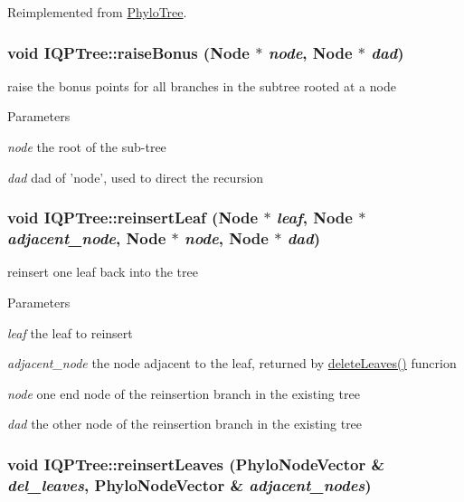 Reimplemented from \hyperlink{classPhyloTree_a8927dbf75a06ea797cc76b619759985d}{PhyloTree}.\hypertarget{classIQPTree_a72733c572a34fce5483d9c58fddc54d1}{
\subsubsection[{raiseBonus}]{\setlength{\rightskip}{0pt plus 5cm}void IQPTree::raiseBonus ({\bf Node} $\ast$ {\em node}, \/  {\bf Node} $\ast$ {\em dad})}}
\label{classIQPTree_a72733c572a34fce5483d9c58fddc54d1}
raise the bonus points for all branches in the subtree rooted at a node 
\begin{DoxyParams}{Parameters}
\item[{\em node}]the root of the sub-\/tree \item[{\em dad}]dad of 'node', used to direct the recursion \end{DoxyParams}
\hypertarget{classIQPTree_ad6adbd783583faa754deb9c6d15eb93f}{
\subsubsection[{reinsertLeaf}]{\setlength{\rightskip}{0pt plus 5cm}void IQPTree::reinsertLeaf ({\bf Node} $\ast$ {\em leaf}, \/  {\bf Node} $\ast$ {\em adjacent\_\-node}, \/  {\bf Node} $\ast$ {\em node}, \/  {\bf Node} $\ast$ {\em dad})}}
\label{classIQPTree_ad6adbd783583faa754deb9c6d15eb93f}
reinsert one leaf back into the tree 
\begin{DoxyParams}{Parameters}
\item[{\em leaf}]the leaf to reinsert \item[{\em adjacent\_\-node}]the node adjacent to the leaf, returned by \hyperlink{classIQPTree_a038522be23c6a8fef71a2a1ffa983976}{deleteLeaves()} funcrion \item[{\em node}]one end node of the reinsertion branch in the existing tree \item[{\em dad}]the other node of the reinsertion branch in the existing tree \end{DoxyParams}
\hypertarget{classIQPTree_a803d8f087733ff4c7d4b400c87b35cea}{
\subsubsection[{reinsertLeaves}]{\setlength{\rightskip}{0pt plus 5cm}void IQPTree::reinsertLeaves (PhyloNodeVector \& {\em del\_\-leaves}, \/  PhyloNodeVector \& {\em adjacent\_\-nodes})}}
